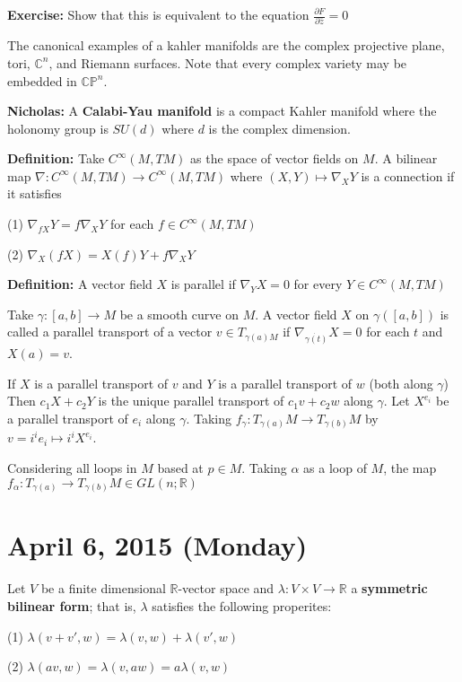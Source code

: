 \documentclass{article}
\begin{document}
\textbf{Exercise:} Show that this is equivalent to the equation $\frac{\partial F}{\partial \bar{z}} = 0$

The canonical examples of a kahler manifolds are the complex projective plane, tori, $\mathbb{C}^n$, and Riemann surfaces. Note that every complex variety may be embedded in $\mathbb{CP}^n$.

\textbf{Nicholas:} A \textbf{Calabi-Yau manifold} is a compact Kahler manifold where the holonomy group is $SU(d)$ where $d$ is the complex dimension.

\textbf{Definition:} Take $C^\infty(M, TM)$ as the space of vector fields on $M$. A bilinear map $\nabla: C^\infty(M, TM) \to C^\infty(M, TM)$ where $(X,Y) \mapsto \nabla_X Y$ is a connection if it satisfies

(1) $\nabla_{fX}Y = f\nabla_XY$ for each $f \in C^\infty(M, TM)$

(2) $\nabla_X(fX) = X(f)Y + f\nabla_XY$

\textbf{Definition:} A vector field $X$ is parallel if $\nabla_YX = 0$ for every $Y \in C^\infty(M, TM)$

Take $\gamma: [a,b] \to M$ be a smooth curve on $M$. A vector field $X$ on $\gamma([a,b])$ is called a parallel transport of a vector $v \in T_{\gamma(a)M}$ if $\nabla_{\dot{\gamma(t)}}X = 0$ for each $t$ and $X(a) = v$.

If $X$ is a parallel transport of $v$ and $Y$ is a parallel transport of $w$ (both along $\gamma$) Then $c_1X + c_2Y$ is the unique parallel transport of $c_1v + c_2w$ along $\gamma$. Let $X^{e_i}$ be a parallel transport of $e_i$ along $\gamma$. Taking $f_\gamma:T_{\gamma(a)}M \to T_{\gamma(b)}M$ by $v = i^ie_i \mapsto i^i X^{e_i}$.

Considering all loops in $M$ based at $p \in M$. Taking $\alpha$ as a loop of $M$, the map $f_\alpha: T_{\gamma(a)} \to T_{\gamma(b)}M \in GL(n; \mathbb{R})$

\section{April 6, 2015 (Monday)}

Let $V$ be a finite dimensional $\mathbb{R}$-vector space and $\lambda:V \times V \to \mathbb{R}$ a \textbf{symmetric bilinear form}; that is, $\lambda$ satisfies the following properites:

(1) $\lambda(v + v',w) = \lambda(v,w) + \lambda(v',w)$

(2) $\lambda(av,w) = \lambda(v,aw) = a\lambda(v,w)$
\end{document}
